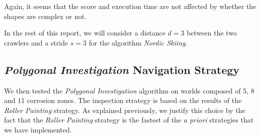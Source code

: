 Again, it seems that the score and execution time are not affected by whether the shapes are complex or not.

In the rest of this report, we will consider a distance $d = 3$ between the two crawlers and a stride $s = 3$ for the algorithm \textit{Nordic Skiing}.

\subsection*{\textit{Polygonal Investigation} Navigation Strategy}

We then tested the \textit{Polygonal Investigation} algorithm on worlds composed of 5, 8 and 11 corrosion zones.
The inspection strategy is based on the results of the \textit{Roller Painting} strategy.
As explained previously, we justify this choice by the fact that the \textit{Roller Painting} strategy is the fastest of the \textit{a priori} strategies that we have implemented.

